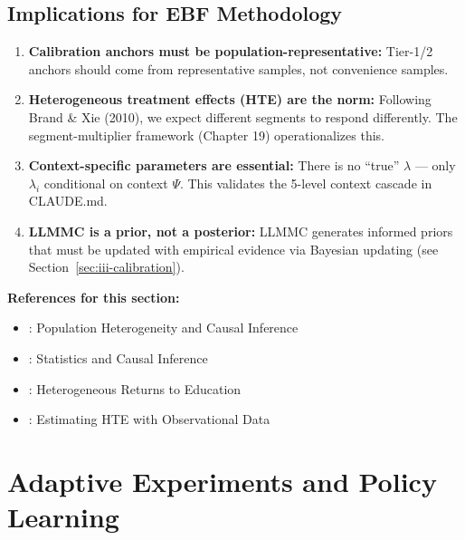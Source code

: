 \subsection{Implications for EBF Methodology}

\begin{enumerate}
\item \textbf{Calibration anchors must be population-representative:}
Tier-1/2 anchors should come from representative samples, not convenience samples.

\item \textbf{Heterogeneous treatment effects (HTE) are the norm:}
Following Brand \& Xie (2010), we expect different segments to respond differently.
The segment-multiplier framework (Chapter 19) operationalizes this.

\item \textbf{Context-specific parameters are essential:}
There is no ``true'' $\lambda$ --- only $\lambda_{i}$ conditional on context $\Psi$.
This validates the 5-level context cascade in CLAUDE.md.

\item \textbf{LLMMC is a prior, not a posterior:}
LLMMC generates informed priors that must be updated with empirical evidence
via Bayesian updating (see Section~\ref{sec:iii-calibration}).
\end{enumerate}

\textbf{References for this section:}
\begin{itemize}[nosep]
\item \citet{PAP-xie2013population}: Population Heterogeneity and Causal Inference
\item \citet{PAP-holland1986statistics}: Statistics and Causal Inference
\item \citet{PAP-brand2010benefits}: Heterogeneous Returns to Education
\item \citet{PAP-xie2012estimating}: Estimating HTE with Observational Data
\end{itemize}



\section{Adaptive Experiments and Policy Learning}
\label{sec:iii-adaptive}

